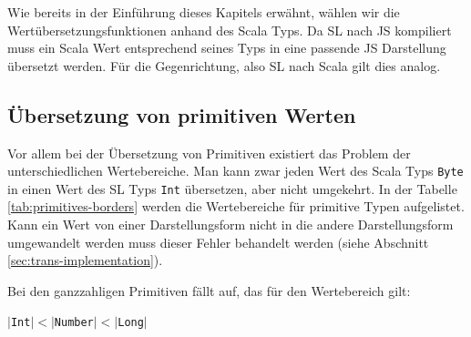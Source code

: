 \documentclass[12pt]{scrreprt}
\begin{document}
Wie bereits in der Einführung dieses Kapitels erwähnt, wählen wir die Wertübersetzungsfunktionen anhand des Scala Typs. Da \ac{SL} nach \ac{JS} kompiliert muss ein Scala Wert entsprechend seines Typs in eine passende \ac{JS} Darstellung übersetzt werden. Für die Gegenrichtung, also \ac{SL} nach Scala gilt dies analog. 

\subsection{Übersetzung von primitiven Werten}
\label{subsec:primitive-value-translation}

Vor allem bei der Übersetzung von Primitiven existiert das Problem der unterschiedlichen Wertebereiche. Man kann zwar jeden Wert des Scala Typs \lstinline!Byte! in einen Wert des \ac{SL} Typs \lstinline!Int! übersetzen, aber nicht umgekehrt. In der Tabelle \ref{tab:primitives-borders} werden die Wertebereiche für primitive Typen aufgelistet. Kann ein Wert von einer Darstellungsform nicht in die andere Darstellungsform umgewandelt werden muss dieser Fehler behandelt werden (siehe Abschnitt \ref{sec:trans-implementation}). 

Bei den ganzzahligen Primitiven fällt auf, das für den Wertebereich gilt:
\begin{center}
$|$\lstinline!Int!$| < |$\lstinline!Number!$| < |$\lstinline!Long!$|$
\end{center}
\end{document}
